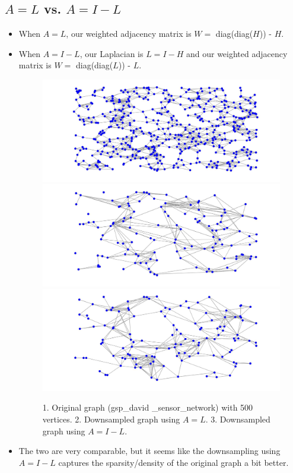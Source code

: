 \documentclass[a4paper]{article}
\begin{document}
\subsection{$A = L$ vs. $A = I - L$}
\begin{itemize}
\item When $A = L$, our weighted adjacency matrix is $W = $ diag(diag($H$)) - $H$. 
\item When $A = I - L$, our Laplacian is $L = I - H$ and our weighted adjacency matrix is $W = $ diag(diag($L$)) - $L$.

\begin{figure}[H]
\centering
\includegraphics[width = 6 cm]{clusters/original_sensor}
\includegraphics[width = 6 cm]{sensor_network/downsampled_L}
\includegraphics[width = 6 cm]{sensor_network/downsampled_I-L}

\caption{1. Original graph (gsp\_david \_sensor\_network) with 500 vertices. 2. Downsampled graph using $A = L$. 3. Downsampled graph using $A = I - L$.}
\end{figure}
\item The two are very comparable, but it seems like the downsampling using $A = I - L$ captures the sparsity/density of the original graph a bit better.
\end{itemize}
\end{document}

